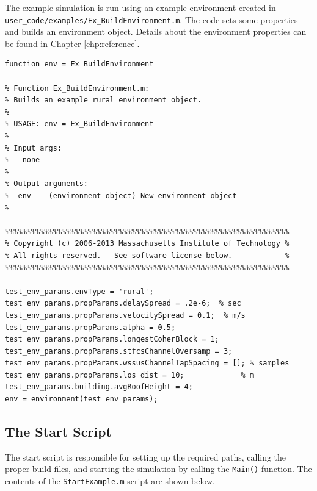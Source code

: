 The example simulation is run using an example environment created
in \verb+user_code/examples/Ex_BuildEnvironment.m+.  The code sets some
properties and builds an environment object.  Details about the environment
properties can be found in Chapter \ref{chp:reference}.

\begin{lstlisting}[name=exEnv]
function env = Ex_BuildEnvironment

% Function Ex_BuildEnvironment.m:
% Builds an example rural environment object.
%
% USAGE: env = Ex_BuildEnvironment
%
% Input args:
%  -none-
%
% Output arguments:
%  env    (environment object) New environment object
%

%%%%%%%%%%%%%%%%%%%%%%%%%%%%%%%%%%%%%%%%%%%%%%%%%%%%%%%%%%%%%%%%%
% Copyright (c) 2006-2013 Massachusetts Institute of Technology %
% All rights reserved.   See software license below.            %
%%%%%%%%%%%%%%%%%%%%%%%%%%%%%%%%%%%%%%%%%%%%%%%%%%%%%%%%%%%%%%%%%

test_env_params.envType = 'rural';
test_env_params.propParams.delaySpread = .2e-6;  % sec
test_env_params.propParams.velocitySpread = 0.1;  % m/s
test_env_params.propParams.alpha = 0.5;
test_env_params.propParams.longestCoherBlock = 1;
test_env_params.propParams.stfcsChannelOversamp = 3;
test_env_params.propParams.wssusChannelTapSpacing = []; % samples
test_env_params.propParams.los_dist = 10;             % m
test_env_params.building.avgRoofHeight = 4;
env = environment(test_env_params);
\end{lstlisting}

\subsection{The Start Script}

The start script is responsible for setting up the required paths,
calling the proper build files, and starting the simulation by
calling the \verb+Main()+ function.  The contents of the
\verb+StartExample.m+ script are shown below.

